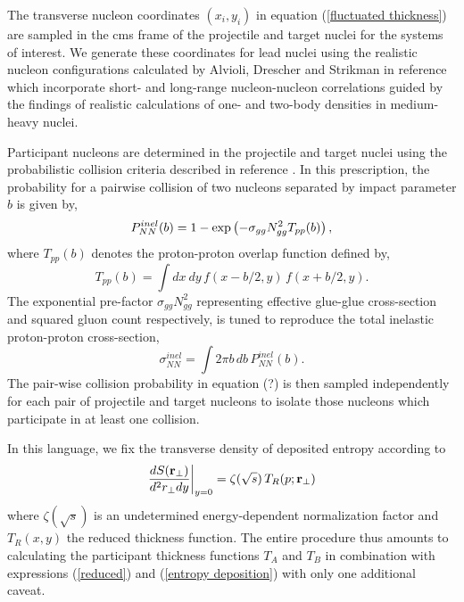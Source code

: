 \documentclass[aps,prl,reprint,amsmath,nofootinbib]{revtex4-1}
\begin{document}
The transverse nucleon coordinates $(x_i,y_i)$ in equation (\ref{fluctuated thickness}) are sampled in the cms frame of the projectile and target nuclei for the systems of interest. We generate
these coordinates for lead nuclei using the realistic nucleon configurations calculated by Alvioli, Drescher and Strikman in reference \cite{nucleon-correlations} which incorporate short- 
and long-range nucleon-nucleon correlations guided by the findings of realistic calculations of one- and two-body densities in medium-heavy nuclei.

Participant nucleons are determined in the projectile and target nuclei using the probabilistic collision criteria described in reference \cite{proton-proton}. In this prescription, the 
probability for a pairwise collision of two nucleons separated by impact parameter $b$ is given by,
\begin{equation}
  P^{inel}_{NN}(b) = 1 - \exp \left(-\sigma_{gg} N_{gg}^2 T_{pp}(b) \right), \\[1ex]
\end{equation}
where $T_{pp}(b)$ denotes the proton-proton overlap function defined by,
\begin{equation}
 T_{pp}(b) = \int dx~dy \,f(x-b/2,y) \,f(x+b/2,y).
\end{equation}
The exponential pre-factor $\sigma_{gg} N_{gg}^2$ representing effective glue-glue cross-section and squared gluon count respectively, is tuned to reproduce the total 
inelastic proton-proton cross-section,
\begin{equation}
  \sigma^{inel}_{NN} = \int 2 \pi b \,db \, P_{NN}^{inel}(b).
\end{equation}
The pair-wise collision probability in equation (?) is then sampled independently for each pair of projectile and target nucleons to isolate those nucleons which 
participate in at least one collision. 

In this language, we fix the transverse density of deposited entropy according to
\begin{equation}
 \label{entropy deposition}
 \frac{dS({\bf r}_\perp)}{d^2r_\perp dy} \biggr \rvert_{y=0} = \zeta(\sqrt{s})\, T_R(p;{\bf r}_\perp)
\end{equation}
where $\zeta(\sqrt{s})$ is an undetermined energy-dependent normalization factor and $T_R(x,y)$ the reduced thickness function. The entire procedure thus amounts to calculating the participant 
thickness functions $T_A$ and $T_B$ in combination with expressions (\ref{reduced}) and (\ref{entropy deposition}) with only one additional caveat.
\end{document}
